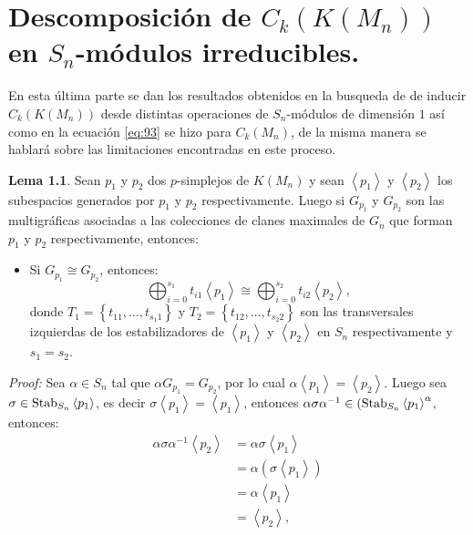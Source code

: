 \documentclass[12pt]{book}
\theoremstyle{definition}
\newtheorem{lemma}[theorem]{Lema}
\newcounter{in}
\begin{document}
\chapter{Descomposición de $C_{k}(K(M_n))$ en $S_{n}$-módulos irreducibles.}
\label{Des_esp_cad}
En esta última parte se dan los resultados obtenidos en la busqueda de de inducir $C_{k}(K(M_{n}))$ desde distintas operaciones de $S_{n}$-módulos de dimensión $1$ así como en la ecuación \ref{eq:93} se hizo para $C_{k}(M_{n})$, de la misma manera se hablará sobre las limitaciones encontradas en este proceso.

\begin{lemma}
Sean $p_{1}$ y $p_{2}$ dos $p$-simplejos de $K(M_{n})$ y sean $\left \langle p_{1} \right \rangle$ y $\left \langle p_{2} \right \rangle$ los subespacios generados por $p_{1}$ y $p_{2}$ respectivamente. Luego si $G_{p_{1}}$ y $G_{p_{2}}$ son las multigráficas asociadas a las colecciones de clanes maximales de $G_{n}$ que forman $p_{1}$ y $p_{2}$ respectivamente, entonces:
\begin{itemize}
\item Si $G_{p_{1}} \cong G_{p_{2}}$, entonces:
$$\bigoplus_{i=0}^{s_{1}} t_{i1}  \left \langle p_{1} \right \rangle \cong \bigoplus_{i=0}^{s_{2}} t_{i2} \left \langle p_{2} \right \rangle,$$
donde $T_{1} = \left \{ t_{11}, \ldots, t_{s_{1}1} \right \}$ y $T_{2} = \left \{ t_{12}, \ldots, t_{s_{2}2} \right \}$ son las transversales izquierdas de los estabilizadores de $\left \langle p_{1} \right \rangle$ y $\left \langle p_{2} \right \rangle$ en $S_{n}$ respectivamente y $s_{1} = s_{2}$.
\end{itemize} 
\end{lemma}
\textit{Proof:}
Sea $\alpha \in S_{n}$ tal que $\alpha G_{p_{1}} = G_{p_{2}}$, por lo cual $\alpha \left \langle p_{1} \right \rangle = \left \langle p_{2} \right \rangle$.
Luego sea $\sigma \in \textup{Stab}_{S_{n}}  \left \langle p_{1} \right \rangle$, es decir $\sigma  \left \langle p_{1} \right \rangle =  \left \langle p_{1} \right \rangle$, entonces $\alpha \sigma \alpha^{-1} \in ( \textup{Stab}_{S_{n}}  \left \langle p_{1} \right \rangle^{\alpha}$, entonces:
\begin{equation*}
\begin{aligned}
\alpha \sigma \alpha^{-1}  \left \langle p_{2} \right \rangle &= \alpha \sigma  \left \langle p_{1} \right \rangle \\
& = \alpha (\sigma  \left \langle p_{1} \right \rangle) \\
& = \alpha  \left \langle p_{1} \right \rangle \\
& =  \left \langle p_{2} \right \rangle,
\end{aligned}
\end{equation*}
\end{document}
